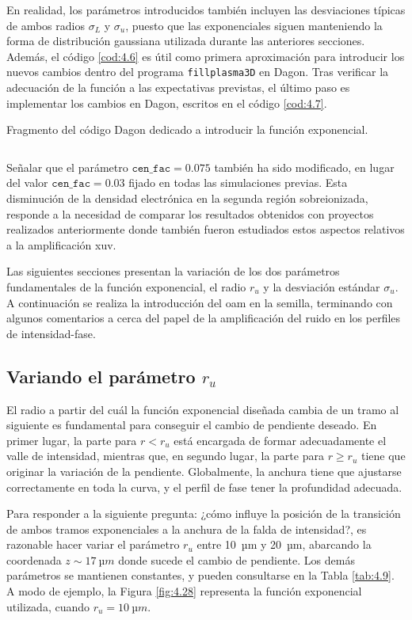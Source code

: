 En realidad, los parámetros introducidos también incluyen las desviaciones típicas de ambos radios $\sigma_{L}$ y $\sigma_{u}$, puesto que las exponenciales siguen manteniendo la forma de distribución gaussiana utilizada durante las anteriores secciones. Además, el código \ref{cod:4.6} es útil como primera aproximación para introducir los nuevos cambios dentro del programa \texttt{fillplasma3D} en Dagon. Tras verificar la adecuación de la función a las expectativas previstas, el último paso es implementar los cambios en Dagon, escritos en el código \ref{cod:4.7}.

\begin{longlisting}
  \caption{Fragmento del código Dagon dedicado a introducir la función exponencial.}
  \inputminted[firstline=1, lastline=80]{fortran}{Programas/plasma3Dt.f90}
  \label{cod:4.7}
\end{longlisting}

Señalar que el parámetro  $\texttt{cen\_fac}=0.075$ también ha sido modificado, en lugar del valor  $\texttt{cen\_fac}=0.03$ fijado en todas las simulaciones previas. Esta disminución de la densidad electrónica en la segunda región sobreionizada, responde a la necesidad de comparar los resultados obtenidos con proyectos realizados anteriormente donde también fueron estudiados estos aspectos relativos a la amplificación \acrshort{xuv}.

Las siguientes secciones presentan la variación de los dos parámetros fundamentales de la función exponencial, el radio $r_{u}$ y la desviación estándar $\sigma_{u}$. A continuación se realiza la introducción del \acrshort{oam} en la semilla, terminando con algunos comentarios a cerca del papel de la amplificación del ruido en los perfiles de intensidad-fase.

\subsection{Variando el parámetro $r_{u}$}\label{sec:4.3.1}
El radio a partir del cuál la función exponencial diseñada cambia de un tramo al siguiente es fundamental para conseguir el cambio de pendiente deseado. En primer lugar, la parte para $r<r_{u}$ está encargada de formar adecuadamente el valle de intensidad, mientras que, en segundo lugar, la parte para $r\geq r_{u}$ tiene que originar la variación de la pendiente. Globalmente, la anchura tiene que ajustarse correctamente en toda la curva, y el perfil de fase tener la profundidad adecuada.

Para responder a la siguiente pregunta: ¿cómo influye la posición de la transición de ambos tramos exponenciales a la anchura de la falda de intensidad?, es razonable hacer variar el parámetro $r_{u}$ entre \qty{10}{µm} y \qty{20}{µm}, abarcando la coordenada $z \sim \qty{17}{µm}$ donde sucede el cambio de pendiente. Los demás parámetros se mantienen constantes, y pueden consultarse en la Tabla \ref{tab:4.9}. A modo de ejemplo, la Figura \ref{fig:4.28} representa la función exponencial utilizada, cuando $r_{u}=\qty{10}{µm}$. 

